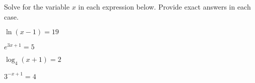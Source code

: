 
\begin{problem}
\item Solve for the variable $x$ in each expression below. Provide
  exact answers in each case.
  \begin{subproblem}
  \item $\ln(x-1)=19$
    \vfill
  \item $e^{3x+1} = 5$
    \vfill
  \item $\log_4(x+1) = 2$
    \vfill
  \item $3^{-x+1} = 4$
    \vfill
  \end{subproblem}
\end{problem}


